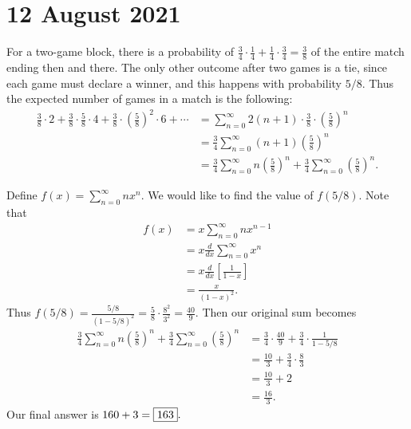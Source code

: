 \documentclass[letterpaper,oneside]{book}
\begin{document}
\section*{12 August 2021}
For a two-game block, there is a probability of $\displaystyle \frac34\cdot\frac14 + \frac14\cdot\frac34 = \frac38$ of the entire match ending then and there. The only other outcome after two games is a tie, since each game must declare a winner, and this happens with probability $5/8.$ Thus the expected number of games in a match is the following:
\begin{align*}
    \frac38\cdot2 + \frac38\cdot\frac58\cdot4+ \frac38\cdot\left(\frac58\right)^2\cdot6 + \cdots 
    &= \sum_{n=0}^{\infty} 2(n+1)\cdot\frac38\cdot\left(\frac58\right)^n \\
    &= \frac34 \sum_{n=0}^{\infty} (n+1)\left(\frac58\right)^n \\
    &= \frac34 \sum_{n=0}^{\infty} n\left(\frac58\right)^n + \frac34\sum_{n=0}^{\infty} \left(\frac58\right)^n.
\end{align*}

Define $f(x) = \sum_{n=0}^\infty nx^n.$ We would like to find the value of $f(5/8).$ Note that
\begin{align*}
    f(x) &= x\sum_{n=0}^{\infty} nx^{n-1} \\
    &= x \frac{d}{dx}\sum_{n=0}^{\infty} x^n \\
    &= x \frac{d}{dx}\left[\frac{1}{1-x}\right]\\
    &= \frac{x}{(1-x)^2}.
\end{align*}
Thus $\displaystyle f(5/8)= \frac{5/8}{(1-5/8)^2} = \frac58 \cdot \frac{8^2}{3^2} = \frac{40}{9}.$ Then our original sum becomes
\begin{align*}
    \frac34 \sum_{n=0}^{\infty} n\left(\frac58\right)^n + \frac34\sum_{n=0}^{\infty} \left(\frac58\right)^n &= \frac34\cdot\frac{40}{9}+\frac34\cdot\frac{1}{1-5/8}\\
    &= \frac{10}{3} + \frac{3}{4}\cdot\frac{8}{3} \\
    &= \frac{10}{3} + 2 \\
    &= \frac{16}{3}.
\end{align*}
Our final answer is $160+3 = \fbox{163}.$
\end{document}
